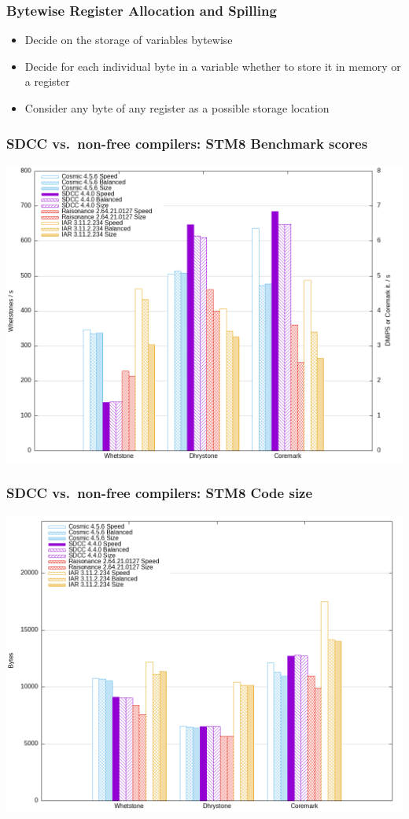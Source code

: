 \documentclass[xcolor=dvipsnames]{beamer}
\begin{document}
\begin{frame}
	\frametitle{Bytewise Register Allocation and Spilling}
	\begin{itemize}
		\item Decide on the storage of variables bytewise
		\item Decide for each individual byte in a variable whether to store it in memory or a register
		\item Consider any byte of any register as a possible storage location
	\end{itemize}
\end{frame}

\begin{frame}
	\frametitle{SDCC vs.\ non-free compilers: STM8 Benchmark scores}
	\centerline{\includegraphics[scale=0.38]{scores-2024.png}}
\end{frame}

\begin{frame}
	\frametitle{SDCC vs.\ non-free compilers: STM8 Code size}
	\centerline{\includegraphics[scale=0.38]{sizes-2024.png}}
\end{frame}
\end{document}
